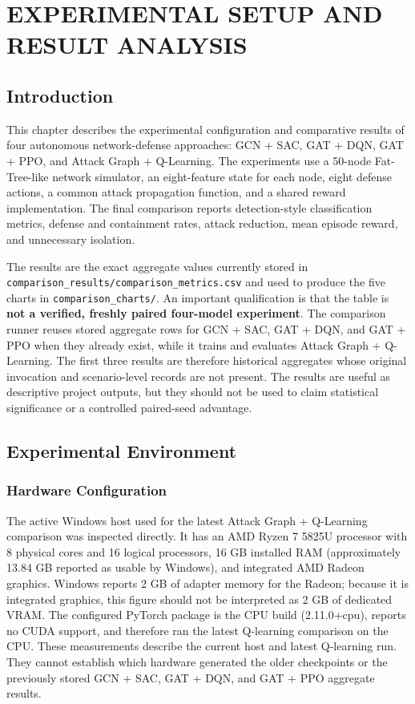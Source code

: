 \documentclass[12pt,a4paper]{report}
\newcommand{\code}[1]{\texttt{#1}}
\begin{document}
\setcounter{chapter}{5}
\chapter{EXPERIMENTAL SETUP AND RESULT ANALYSIS}

\section{Introduction}

This chapter describes the experimental configuration and comparative results of four autonomous network-defense approaches: GCN + SAC, GAT + DQN, GAT + PPO, and Attack Graph + Q-Learning. The experiments use a 50-node Fat-Tree-like network simulator, an eight-feature state for each node, eight defense actions, a common attack propagation function, and a shared reward implementation. The final comparison reports detection-style classification metrics, defense and containment rates, attack reduction, mean episode reward, and unnecessary isolation.

The results are the exact aggregate values currently stored in \code{comparison_results/comparison_metrics.csv} and used to produce the five charts in \code{comparison_charts/}. An important qualification is that the table is \textbf{not a verified, freshly paired four-model experiment}. The comparison runner reuses stored aggregate rows for GCN + SAC, GAT + DQN, and GAT + PPO when they already exist, while it trains and evaluates Attack Graph + Q-Learning. The first three results are therefore historical aggregates whose original invocation and scenario-level records are not present. The results are useful as descriptive project outputs, but they should not be used to claim statistical significance or a controlled paired-seed advantage.

\section{Experimental Environment}

\subsection{Hardware Configuration}

The active Windows host used for the latest Attack Graph + Q-Learning comparison was inspected directly. It has an AMD Ryzen 7 5825U processor with 8 physical cores and 16 logical processors, 16 GB installed RAM (approximately 13.84 GB reported as usable by Windows), and integrated AMD Radeon graphics. Windows reports 2 GB of adapter memory for the Radeon; because it is integrated graphics, this figure should not be interpreted as 2 GB of dedicated VRAM. The configured PyTorch package is the CPU build (2.11.0+cpu), reports no CUDA support, and therefore ran the latest Q-learning comparison on the CPU. These measurements describe the current host and latest Q-learning run. They cannot establish which hardware generated the older checkpoints or the previously stored GCN + SAC, GAT + DQN, and GAT + PPO aggregate results.
\end{document}
